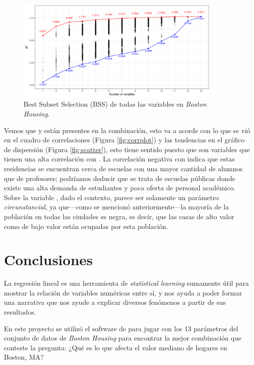 \documentclass[11pt, letterpaper]{article}
\begin{document}
\begin{figure}[h!]
	\centering
	\includegraphics[width=0.9\textwidth]{figuras/best subset selection.png}
	\caption{Best Subset Selection (BSS) de todas las variables en \textit{Boston Housing}.}
	\label{fig:bss}
\end{figure}

Vemos que  y  están presentes en la combinación, esto va a acorde con lo que se vió en el cuadro de correlaciones (Figura \ref{fig:corrplot}) y las tendencias en el gráfico de dispersión (Figura \ref{fig:scatter}), esto tiene sentido puesto que son variables que tienen una alta correlación con . La correlación negativa con  indica que estas residencias se encuentran cerca de escuelas con una mayor cantidad de alumnos que de profesores; podríamos deducir que se trata de escuelas públicas donde existe una alta demanda de estudiantes y poca oferta de personal académico. Sobre la variable , dado el contexto, parece ser solamente un parámetro \textit{circunstancial}, ya que---como se mencionó anteriormente---la mayoría de la población en todas las ciudades es negra, es decir, que las casas de alto valor como de bajo valor están ocupadas por esta población.

\section{Conclusiones}
La regresión lineal es una herramienta de \textit{statistical learning} sumamente útil para mostrar la relación de variables numéricas entre sí, y nos ayuda a poder formar una narrativa que nos ayude a explicar diversos fenómenos a partir de sus resultados.

En este proyecto se utilizó el software de  para jugar con los 13 parámetros del conjunto de datos de \textit{Boston Housing} para encontrar la mejor combinación que conteste la pregunta: ¿Qué es lo que afecta el valor mediano de hogares en Boston, MA?
\end{document}
